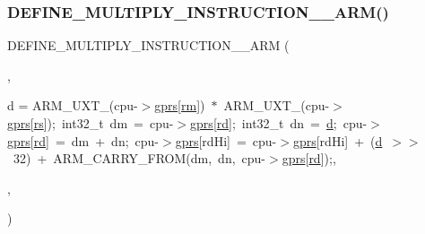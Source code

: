 \mbox{\label{isa-arm_8c_ae86c7628a32889429318e883406e5381}} 
\subsubsection{\texorpdfstring{D\+E\+F\+I\+N\+E\+\_\+\+M\+U\+L\+T\+I\+P\+L\+Y\+\_\+\+I\+N\+S\+T\+R\+U\+C\+T\+I\+O\+N\+\_\+\_\+\+A\+R\+M()}{DEFINE\_MULTIPLY\_INSTRUCTION\_2\_ARM()}\hspace{0.1cm}{\footnotesize\ttfamily [2/2]}}
{\footnotesize\ttfamily D\+E\+F\+I\+N\+E\+\_\+\+M\+U\+L\+T\+I\+P\+L\+Y\+\_\+\+I\+N\+S\+T\+R\+U\+C\+T\+I\+O\+N\+\_\+\_\+\+A\+RM (\begin{DoxyParamCaption}\item[{U\+M\+L\+AL}]{,  }\item[{uint64\+\_\+t}]{d = {\ttfamily ARM\+\_\+UXT\+\_(cpu-\/$>$\mbox{\hyperlink{isa-thumb_8c_a6b4b7e13a9a144391615b217c5917bc7}{gprs}}\mbox{[}\mbox{\hyperlink{isa-thumb_8c_a20e40d2fb8c51fa4dd2b4449ad32e111}{rm}}\mbox{]})~$\ast$~ARM\+\_\+UXT\+\_(cpu-\/$>$\mbox{\hyperlink{isa-thumb_8c_a6b4b7e13a9a144391615b217c5917bc7}{gprs}}\mbox{[}\mbox{\hyperlink{isa-thumb_8c_a03b78d51ad860bbea2f9c98276d0b70b}{rs}}\mbox{]});~int32\+\_\+t~dm~=~cpu-\/$>$\mbox{\hyperlink{isa-thumb_8c_a6b4b7e13a9a144391615b217c5917bc7}{gprs}}\mbox{[}\mbox{\hyperlink{isa-arm_8c_a555541ce18ed9b5fad657a06b22cb465}{rd}}\mbox{]};~int32\+\_\+t~dn~=~\mbox{\hyperlink{isa-thumb_8c_a6f364afbe132c4ecfea48bde1b0618ba}{d}};~cpu-\/$>$\mbox{\hyperlink{isa-thumb_8c_a6b4b7e13a9a144391615b217c5917bc7}{gprs}}\mbox{[}\mbox{\hyperlink{isa-arm_8c_a555541ce18ed9b5fad657a06b22cb465}{rd}}\mbox{]}~=~dm~+~dn;~cpu-\/$>$\mbox{\hyperlink{isa-thumb_8c_a6b4b7e13a9a144391615b217c5917bc7}{gprs}}\mbox{[}rdHi\mbox{]}~=~cpu-\/$>$\mbox{\hyperlink{isa-thumb_8c_a6b4b7e13a9a144391615b217c5917bc7}{gprs}}\mbox{[}rdHi\mbox{]}~+~(\mbox{\hyperlink{isa-thumb_8c_a6f364afbe132c4ecfea48bde1b0618ba}{d}}~$>$$>$~32)~+~ARM\+\_\+CARRY\+\_\+FROM(dm,~dn,~cpu-\/$>$\mbox{\hyperlink{isa-thumb_8c_a6b4b7e13a9a144391615b217c5917bc7}{gprs}}\mbox{[}\mbox{\hyperlink{isa-arm_8c_a555541ce18ed9b5fad657a06b22cb465}{rd}}\mbox{]});},  }\item[{\mbox{\hyperlink{isa-arm_8c_a0aa68e4c9ded96edf53ab6eceb66b377}{A\+R\+M\+\_\+\+N\+E\+U\+T\+R\+A\+L\+\_\+\+H\+I\+\_\+S}}(cpu-\/$>$\mbox{\hyperlink{isa-thumb_8c_a6b4b7e13a9a144391615b217c5917bc7}{gprs}}\mbox{[}\mbox{\hyperlink{isa-arm_8c_a555541ce18ed9b5fad657a06b22cb465}{rd}}\mbox{]}, cpu-\/$>$\mbox{\hyperlink{isa-thumb_8c_a6b4b7e13a9a144391615b217c5917bc7}{gprs}}\mbox{[}rd\+Hi\mbox{]})}]{,  }\item[{3}]{ }\end{DoxyParamCaption})}

